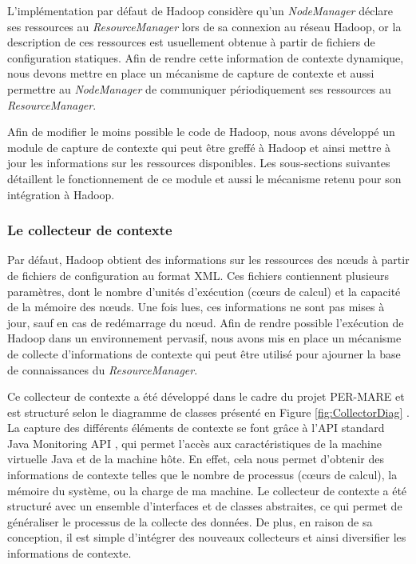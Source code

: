 L'implémentation par défaut de Hadoop considère qu'un \textit{NodeManager} déclare ses ressources au \textit{ResourceManager} lors de sa connexion au réseau Hadoop, or la description de ces ressources est usuellement obtenue à partir de fichiers de configuration statiques. Afin de rendre cette information de contexte dynamique, nous devons mettre en place un mécanisme de capture de contexte et aussi permettre au \textit{NodeManager} de communiquer périodiquement ses ressources au \textit{ResourceManager}. 

Afin de modifier le moins possible le code de Hadoop, nous avons développé un module de capture de contexte qui peut être greffé à Hadoop et ainsi mettre à jour les informations sur les ressources disponibles. Les sous-sections suivantes détaillent le fonctionnement de ce module et aussi le mécanisme retenu pour son intégration à Hadoop.

\subsubsection{Le collecteur de contexte\label{sec:gestionnairecontexte}}
Par défaut, Hadoop obtient des informations sur les ressources des n{\oe}uds à partir de fichiers de configuration au format XML. Ces fichiers contiennent plusieurs paramètres, dont le nombre d'unités d'exécution (c{\oe}urs de calcul) et la capacité de la mémoire des n{\oe}uds. Une fois lues, ces informations ne sont pas mises à jour, sauf en cas de redémarrage du n{\oe}ud. Afin de rendre possible l'exécution de Hadoop dans un environnement pervasif, nous avons mis en place un mécanisme de collecte d'informations de contexte qui peut être utilisé pour ajourner la base de connaissances du \textit{ResourceManager}.

Ce collecteur de contexte a été développé dans le cadre du projet PER-MARE\cite{PER-MARE} et est structuré selon le diagramme de classes présenté en Figure \ref{fig:CollectorDiag} \cite{UBICOMM2014}. La capture des différents éléments de contexte se font grâce à l'API standard Java Monitoring API \cite{Oracle}, qui permet l'accès aux caractéristiques de la machine virtuelle Java et de la machine hôte. En effet, cela nous permet d'obtenir des informations de contexte telles que le nombre de processus (c{\oe}urs de calcul), la mémoire du système, ou la charge de ma machine. Le collecteur de contexte a été structuré avec un ensemble d'interfaces et de classes abstraites, ce qui permet de généraliser le processus de la collecte des données. De plus, en raison de sa conception, il est simple d'intégrer des nouveaux collecteurs et ainsi diversifier les informations de contexte.

